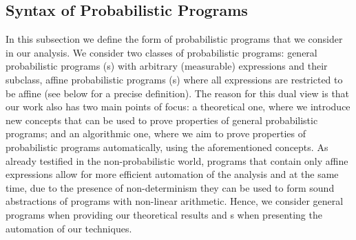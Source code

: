 

\vspace{-1em}
\subsection{Syntax of Probabilistic Programs}\label{subsec:syntax}
\vspace{-0.5em}

In this subsection we define the form of probabilistic programs that we 
consider in our analysis. We consider two classes of probabilistic programs: 
general probabilistic programs (\PP{}s) with arbitrary (measurable) 
expressions and 
their subclass, affine probabilistic programs (\APP s) where all expressions 
are restricted to be affine (see below for a precise definition). The reason 
for this dual view is that our work also has two main points of focus: a 
theoretical one, where we introduce new concepts that can be used to prove 
properties of general probabilistic programs; and an algorithmic one, where we 
aim to prove properties of probabilistic programs automatically, using the 
aforementioned concepts. As already testified in the non-probabilistic 
world, programs that contain only affine expressions allow for more efficient 
automation of the analysis and at the same time, due to the presence of 
non-determinism they can be used to form sound abstractions of programs with 
non-linear arithmetic. Hence, we consider general programs when providing our 
theoretical results and \APP s when presenting the automation of our techniques.

